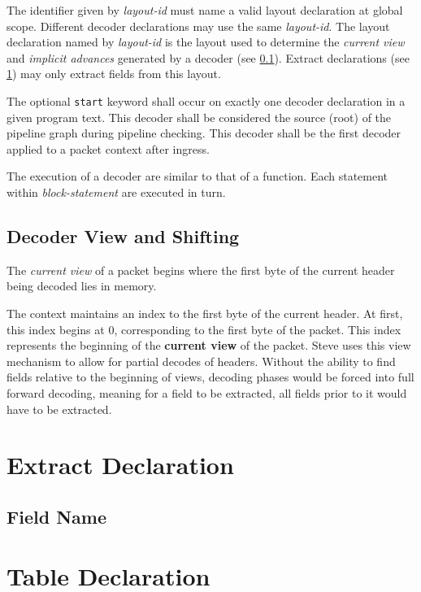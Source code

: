 The identifier given by \textit{layout-id} must name a valid layout declaration at global scope. Different decoder declarations may use the same \textit{layout-id}. The layout declaration named by \textit{layout-id} is the layout used to determine the \textit{current view} and \textit{implicit advances} generated by a decoder (see \ref{decoder_view}). Extract declarations (see \ref{extract_guide}) may only extract fields from this layout.

The optional \texttt{start} keyword shall occur on exactly one decoder declaration in a given program text. This decoder shall be considered the source (root) of the pipeline graph during pipeline checking. This decoder shall be the first decoder applied to a packet context after ingress.

The execution of a decoder are similar to that of a function. Each statement within \textit{block-statement} are executed in turn. 

\subsection{Decoder View and Shifting} \label{decoder_view}

The \textit{current view} of a packet begins where the first byte of the current header being decoded lies in memory.

The context maintains an index to the first byte of the current header. At first, this index begins at 0, corresponding to the first byte of the packet.
This index represents the beginning of the \textbf{current view} of the packet. Steve uses this view mechanism to allow for partial decodes of headers. Without the ability to find fields relative to the beginning of views, decoding phases would be forced into full forward decoding, meaning for a field to be extracted, all fields prior to it would have to be extracted.

\section{Extract Declaration} \label{extract_guide}

\subsection{Field Name} \label{field_name}

\section{Table Declaration} \label{table_guide}

